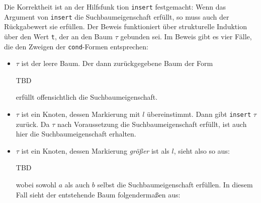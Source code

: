 \begin{beweis}
  Die Korrektheit ist an der Hilfsfunk tion \texttt{insert}
  festgemacht: Wenn das Argument von \texttt{insert} die
  Suchbaumeigenschaft erfüllt, so muss auch der Rückgabewert sie
  erfüllen.  Der Beweis funktioniert über strukturelle Induktion über
  den Wert \texttt{t}, der an den Baum $\tau$ gebunden sei.  Im
  Beweis gibt es vier Fälle, die den Zweigen der \texttt{cond}-Formen
  entsprechen:
%
\begin{itemize}
\item $\tau$ ist der leere Baum.  Der dann zurückgegebene Baum
  der Form

  TBD
  
erfüllt offensichtlich die Suchbaumeigenschaft.
\item $\tau$ ist ein Knoten, dessen Markierung mit
  $l$ übereinstimmt.  Dann gibt \texttt{insert} 
  $\tau$ zurück.  Da $\tau$ nach Voraussetzung die
  Suchbaumeigenschaft erfüllt, ist auch hier die
  Suchbaumeigenschaft erhalten.
\item $\tau$ ist ein Knoten, dessen Markierung \emph{größer}
  ist als $l$, sieht also so aus:

  TBD
  
  wobei sowohl $a$ als auch $b$ selbst die Suchbaumeigenschaft
  erfüllen. In diesem
  Fall sieht der entstehende Baum folgendermaßen aus:


\end{itemize}
\end{beweis}
